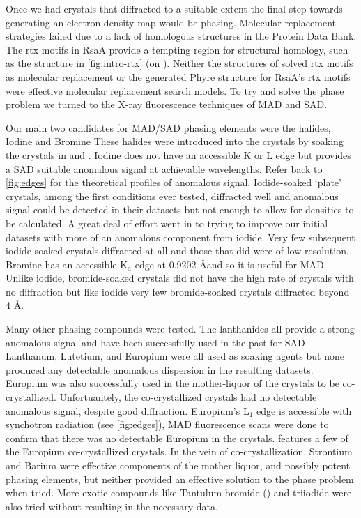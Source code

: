  Once we had crystals that diffracted to a suitable extent the final step towards generating an electron density map would be phasing. Molecular replacement strategies failed due to a lack of homologous structures in the Protein Data Bank. The \ac{rtx}  motifs in RsaA provide a tempting region for structural homology, such as the structure in \cref{fig:intro-rtx} (on ). Neither the structures of solved \ac{rtx} motifs as molecular replacement  or the generated Phyre structure for RsaA's \ac{rtx} motifs were effective molecular replacement search models. To try and solve the phase problem we turned to the X-ray fluorescence techniques of \ac{MAD} and \ac{SAD}. 

Our main two candidates for \ac{MAD}/\ac{SAD} phasing elements were the halides, Iodine and  Bromine These halides were introduced into the crystals by soaking the crystals in  and . Iodine does not have an accessible K or L edge but provides a \ac{SAD}  suitable anomalous signal at achievable wavelengths. Refer back to \cref{fig:edges} for the theoretical profiles of anomalous signal. Iodide-soaked `plate' crystals, among the first conditions ever tested, diffracted well and anomalous signal could be detected in their datasets but not enough to allow for densities to be calculated. A great deal of effort went in to trying to improve our initial datasets with more of an anomalous component from iodide. Very few subsequent iodide-soaked crystals diffracted at all  and those that did were of low resolution. Bromine has an accessible K$_{a}$ edge at 0.9202 \AA and so it is useful for \ac{MAD}. Unlike iodide, bromide-soaked crystals did not have the high rate of crystals  with no diffraction but like iodide very few bromide-soaked crystals diffracted beyond 4 \AA{}. 

Many other phasing compounds were tested. The lanthanides all provide a strong  anomalous signal and have been successfully used in the past for \ac{SAD} Lanthanum, Lutetium, and Europium were all used as soaking agents but none produced any detectable anomalous dispersion in the resulting datasets. Europium was also successfully used in the mother-liquor of the crystals to be co-crystallized. Unfortuantely, the co-crystallized crystals had no detectable anomalous signal, despite good diffraction. Europium's L$_{1}$ edge is accessible with synchotron radiation (see \cref{fig:edges}), \ac{MAD} fluorescence scans were done to confirm that there was no detectable Europium in the crystals.  features a few of the Europium co-crystallized crystals. In the vein of co-crystallization, Strontium and Barium were effective components of the mother liquor, and possibly potent phasing elements, but neither provided an effective solution to the phase problem when tried. More exotic compounds like Tantulum bromide () and  triiodide were also tried without resulting in the necessary data. 
 
